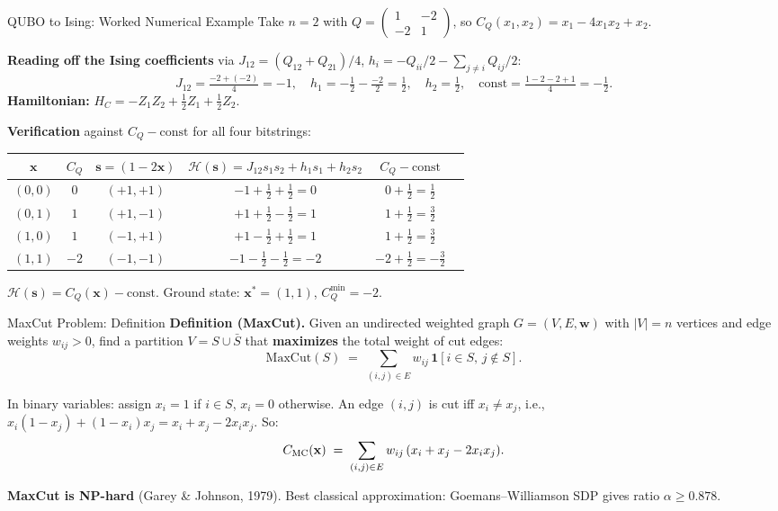 \documentclass{beamer}
\begin{document}

\begin{frame}{QUBO to Ising: Worked Numerical Example}
Take $n=2$ with $Q = \begin{pmatrix}1 & -2\\ -2 & 1\end{pmatrix}$,
so $C_Q(x_1,x_2) = x_1 - 4x_1x_2 + x_2$.

\medskip
\textbf{Reading off the Ising coefficients} via $J_{12}=(Q_{12}+Q_{21})/4$,
$h_i = -Q_{ii}/2 - \sum_{j\neq i}Q_{ij}/2$:
\[
J_{12} = \tfrac{-2+(-2)}{4} = -1,\quad
h_1 = -\tfrac{1}{2}-\tfrac{-2}{2} = \tfrac{1}{2},\quad
h_2 = \tfrac{1}{2},\quad
\text{const} = \tfrac{1-2-2+1}{4} = -\tfrac{1}{2}.
\]
\textbf{Hamiltonian:}
$H_C = -Z_1Z_2 + \tfrac{1}{2}Z_1 + \tfrac{1}{2}Z_2$.

\medskip
\textbf{Verification} against $C_Q - \text{const}$ for all four bitstrings:
\begin{center}
\small
\begin{tabular}{cccccc}
\hline
$\mathbf{x}$ & $C_Q$ & $\mathbf{s}=(1-2\mathbf{x})$ & $\mathcal{H}(\mathbf{s})=J_{12}s_1s_2+h_1s_1+h_2s_2$ & $C_Q-\text{const}$ \\
\hline
$(0,0)$ & $0$  & $(+1,+1)$ & $-1+\tfrac{1}{2}+\tfrac{1}{2}=0$ & $0+\tfrac{1}{2}=\tfrac{1}{2}$ \\
$(0,1)$ & $1$  & $(+1,-1)$ & $+1+\tfrac{1}{2}-\tfrac{1}{2}=1$ & $1+\tfrac{1}{2}=\tfrac{3}{2}$ \\
$(1,0)$ & $1$  & $(-1,+1)$ & $+1-\tfrac{1}{2}+\tfrac{1}{2}=1$ & $1+\tfrac{1}{2}=\tfrac{3}{2}$ \\
$(1,1)$ & $-2$ & $(-1,-1)$ & $-1-\tfrac{1}{2}-\tfrac{1}{2}=-2$ & $-2+\tfrac{1}{2}=-\tfrac{3}{2}$ \\
\hline
\end{tabular}
\end{center}
$\mathcal{H}(\mathbf{s}) = C_Q(\mathbf{x}) - \text{const}$. \checkmark\quad
Ground state: $\mathbf{x}^*=(1,1)$, $C_Q^{\min}=-2$.
\end{frame}


\begin{frame}{MaxCut Problem: Definition}
\textbf{Definition (MaxCut).}  Given an undirected weighted graph
$G = (V,E,\mathbf{w})$ with $|V|=n$ vertices and edge weights
$w_{ij}>0$, find a partition $V = S \cup \bar{S}$ that
\textbf{maximizes} the total weight of cut edges:
\[
\text{MaxCut}(S) \;=\; \sum_{(i,j)\in E} w_{ij}\,
\mathbf{1}[i\in S,\,j\notin S].
\]

\medskip

In binary variables: assign $x_i = 1$ if $i\in S$, $x_i=0$ otherwise.
An edge $(i,j)$ is cut iff $x_i \neq x_j$, i.e., $x_i(1-x_j) +
(1-x_i)x_j = x_i + x_j - 2x_ix_j$. So:
\[
C_{\rm MC}(\mathbf{x}) \;=\;
\sum_{(i,j)\in E} w_{ij}\,(x_i + x_j - 2x_ix_j).
\]

\textbf{MaxCut is NP-hard} (Garey \& Johnson, 1979). Best classical
approximation: Goemans--Williamson SDP gives ratio $\alpha \ge 0.878$.
\end{frame}
\end{document}
